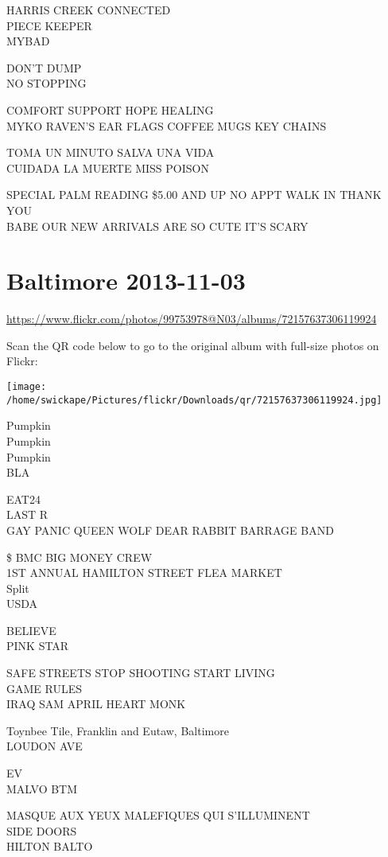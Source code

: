 \documentclass[10pt,letterpaper]{article}
\begin{document}
HARRIS CREEK CONNECTED\\
PIECE KEEPER\\
MYBAD

DON'T DUMP\\
NO STOPPING

COMFORT SUPPORT HOPE HEALING\\
MYKO RAVEN'S EAR FLAGS COFFEE MUGS KEY CHAINS

TOMA UN MINUTO SALVA UNA VIDA\\
CUIDADA LA MUERTE MISS POISON

SPECIAL PALM READING \$5.00 AND UP NO APPT WALK IN THANK YOU\\
BABE OUR NEW ARRIVALS ARE SO CUTE IT'S SCARY


\section*{Baltimore 2013-11-03}

\url{https://www.flickr.com/photos/99753978@N03/albums/72157637306119924}

Scan the QR code below to go to the original album with full-size photos on Flickr:

\texttt{[image: /home/swickape/Pictures/flickr/Downloads/qr/72157637306119924.jpg]}


Pumpkin\\
Pumpkin\\
Pumpkin\\
BLA

EAT24\\
LAST R\\
GAY PANIC QUEEN WOLF DEAR RABBIT BARRAGE BAND

\$ BMC BIG MONEY CREW\\
1ST ANNUAL HAMILTON STREET FLEA MARKET\\
Split\\
USDA

BELIEVE\\
PINK STAR

SAFE STREETS STOP SHOOTING START LIVING\\
GAME RULES\\
IRAQ SAM APRIL HEART MONK

Toynbee Tile, Franklin and Eutaw, Baltimore\\
LOUDON AVE

EV\\
MALVO BTM

MASQUE AUX YEUX MALEFIQUES QUI S'ILLUMINENT\\
SIDE DOORS\\
HILTON BALTO
\end{document}
